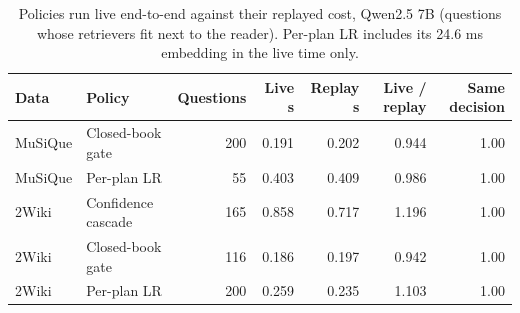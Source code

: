 \begin{table}[t]
\centering\small
\setlength{\tabcolsep}{4pt}
\caption{Policies run live end-to-end against their replayed cost, Qwen2.5 7B (questions whose retrievers fit next to the reader). Per-plan LR includes its 24.6 ms embedding in the live time only.}
\label{tab:review_latency_policies}
\begin{tabular*}{\linewidth}{@{\extracolsep{\fill}}llrrrrr}
\toprule
Data & Policy & Questions & Live s & Replay s & Live / replay & Same decision \\
\midrule
MuSiQue & Closed-book gate & 200 & 0.191 & 0.202 & 0.944 & 1.00 \\
MuSiQue & Per-plan LR & 55 & 0.403 & 0.409 & 0.986 & 1.00 \\
2Wiki & Confidence cascade & 165 & 0.858 & 0.717 & 1.196 & 1.00 \\
2Wiki & Closed-book gate & 116 & 0.186 & 0.197 & 0.942 & 1.00 \\
2Wiki & Per-plan LR & 200 & 0.259 & 0.235 & 1.103 & 1.00 \\
\bottomrule
\end{tabular*}
\end{table}
